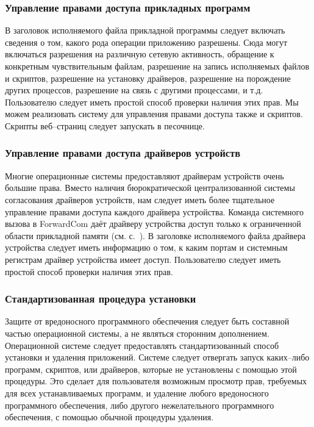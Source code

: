\documentclass[forwardcom.tex]{subfiles}
\begin{document}
\subsubsection{Управление правами доступа прикладных программ} 
В заголовок исполняемого файла прикладной программы следует включать сведения о том, какого рода операции приложению разрешены. Сюда могут включаться разрешения на различную сетевую активность, обращение к конкретным чувствительным файлам, разрешение на запись исполняемых файлов и скриптов, разрешение на установку драйверов, разрешение на порождение других процессов, разрешение на связь с другими процессами, и т.д. Пользователю следует иметь простой способ проверки наличия этих прав. Мы можем реализовать систему для управления правами доступа также и скриптов. Скрипты веб--страниц следует запускать в песочнице.

\subsubsection{Управление правами доступа драйверов устройств} 
Многие операционные системы предоставляют драйверам устройств очень большие права. Вместо наличия бюрократической централизованной системы согласования драйверов устройств, нам следует иметь более тщательное управление правами доступа каждого драйвера устройства. Команда системного вызова в ForwardCom даёт драйверу устройства доступ только к ограниченной области прикладной памяти (см. с.~\pageref{systemCallInstruction}). В заголовке исполняемого файла драйвера устройства следует иметь информацию о том, к каким портам и системным регистрам драйвер устройства имеет доступ. Пользователю следует иметь простой способ проверки наличия этих прав.

\subsubsection{Стандартизованная процедура установки} 
Защите от вредоносного программного обеспечения следует быть составной частью операционной системы, а не являться сторонним дополнением. Операционной системе следует предоставлять стандартизованный способ установки и удаления приложений. Системе следует отвергать запуск каких--либо программ, скриптов, или драйверов, которые не установлены с помощью этой процедуры. Это сделает для пользователя возможным просмотр прав, требуемых для всех устанавливаемых программ, и удаление любого вредоносного программного обеспечения, либо другого нежелательного программного обеспечения, с помощью обычной процедуры удаления.
\end{document}
